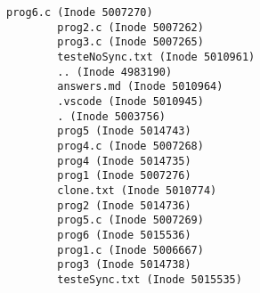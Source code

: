 \documentclass[a4paper, 11pt, answers]{exam}
\begin{document}
\begin{questions}
\begin{parts}
\begin{solution}
        \begin{Verbatim}[label={\$ ./prog6 .}]
        prog6.c (Inode 5007270)
        prog2.c (Inode 5007262)
        prog3.c (Inode 5007265)
        testeNoSync.txt (Inode 5010961)
        .. (Inode 4983190)
        answers.md (Inode 5010964)
        .vscode (Inode 5010945)
        . (Inode 5003756)
        prog5 (Inode 5014743)
        prog4.c (Inode 5007268)
        prog4 (Inode 5014735)
        prog1 (Inode 5007276)
        clone.txt (Inode 5010774)
        prog2 (Inode 5014736)
        prog5.c (Inode 5007269)
        prog6 (Inode 5015536)
        prog1.c (Inode 5006667)
        prog3 (Inode 5014738)
        testeSync.txt (Inode 5015535)
        \end{Verbatim}
      \end{solution}
    \end{parts}
  \end{questions}
\end{document}
